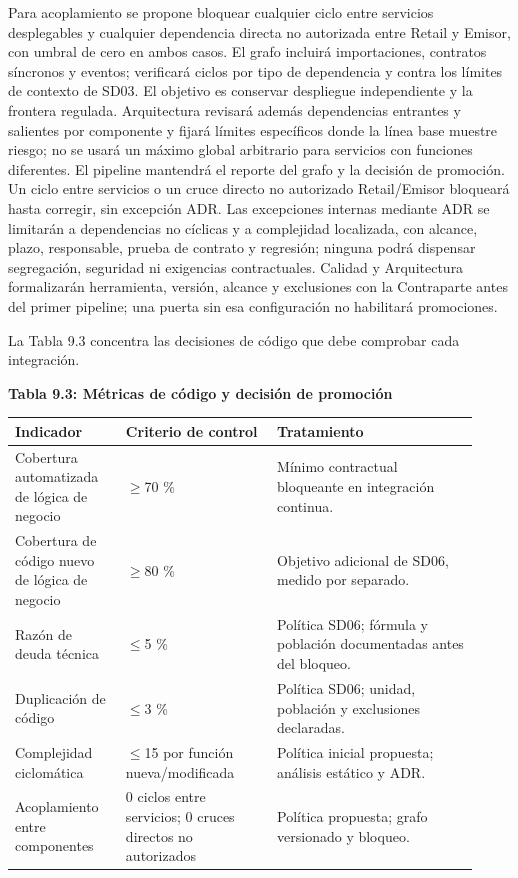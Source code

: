 \documentclass[11pt]{article}
\begin{document}
Para acoplamiento se propone bloquear cualquier ciclo entre servicios desplegables y cualquier dependencia directa no autorizada entre Retail y Emisor, con umbral de cero en ambos casos. El grafo incluirá importaciones, contratos síncronos y eventos; verificará ciclos por tipo de dependencia y contra los límites de contexto de SD03. El objetivo es conservar despliegue independiente y la frontera regulada. Arquitectura revisará además dependencias entrantes y salientes por componente y fijará límites específicos donde la línea base muestre riesgo; no se usará un máximo global arbitrario para servicios con funciones diferentes. El pipeline mantendrá el reporte del grafo y la decisión de promoción. Un ciclo entre servicios o un cruce directo no autorizado Retail/Emisor bloqueará hasta corregir, sin excepción ADR. Las excepciones internas mediante ADR se limitarán a dependencias no cíclicas y a complejidad localizada, con alcance, plazo, responsable, prueba de contrato y regresión; ninguna podrá dispensar segregación, seguridad ni exigencias contractuales. Calidad y Arquitectura formalizarán herramienta, versión, alcance y exclusiones con la Contraparte antes del primer pipeline; una puerta sin esa configuración no habilitará promociones.

La Tabla 9.3 concentra las decisiones de código que debe comprobar cada integración.

\textbf{Tabla 9.3: Métricas de código y decisión de promoción}\label{tab:9-3}

\begin{longtable}{p{0.22\linewidth}p{0.3\linewidth}p{0.4\linewidth}}
\toprule
Indicador & Criterio de control & Tratamiento \\
\midrule
\endhead
Cobertura automatizada de lógica de negocio & $\geq$70 \% & Mínimo contractual bloqueante en integración continua. \\
Cobertura de código nuevo de lógica de negocio & $\geq$80 \% & Objetivo adicional de SD06, medido por separado. \\
Razón de deuda técnica & $\leq$5 \% & Política SD06; fórmula y población documentadas antes del bloqueo. \\
Duplicación de código & $\leq$3 \% & Política SD06; unidad, población y exclusiones declaradas. \\
Complejidad ciclomática & $\leq$15 por función nueva/modificada & Política inicial propuesta; análisis estático y ADR. \\
Acoplamiento entre componentes & 0 ciclos entre servicios; 0 cruces directos no autorizados & Política propuesta; grafo versionado y bloqueo. \\
\bottomrule
\end{longtable}
\end{document}
